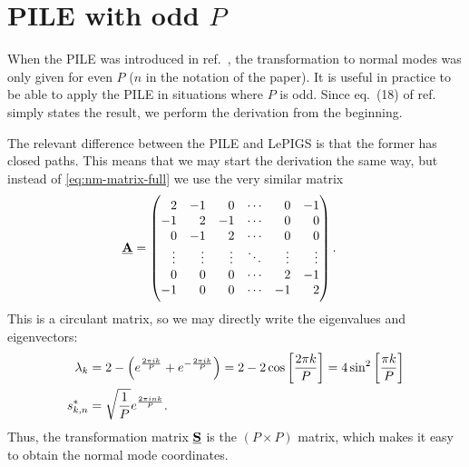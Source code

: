 \section{PILE with odd $P$}

\label{sec:pile-odd}

When the PILE was introduced in ref.~\cite{ceriotti2010efficient}, the transformation to normal modes was only given for even $P$ ($n$ in the notation of the paper).
It is useful in practice to be able to apply the PILE in situations where $P$ is odd.
Since eq.~(18) of ref.~\cite{ceriotti2010efficient} simply states the result, we perform the derivation from the beginning.

The relevant difference between the PILE and LePIGS is that the former has closed paths.
This means that we may start the derivation the same way, but instead of \vref{eq:nm-matrix-full} we use the very similar matrix
\begin{align}
	\underline{\bm{\mathbf{A}}}
	&= \begin{pmatrix}
			\phantom{-}2 & -1 & \phantom{-}0 & \cdots & \phantom{-}0 & -1 \\
			-1 & \phantom{-}2 & -1 & \cdots & \phantom{-}0 & \phantom{-}0 \\
			\phantom{-}0 & -1 & \phantom{-}2 & \cdots & \phantom{-}0 & \phantom{-}0 \\
			\phantom{-}\vdots & \phantom{-}\vdots & \phantom{-}\vdots & \ddots & \phantom{-}\vdots & \phantom{-}\vdots \\
			\phantom{-}0 & \phantom{-}0 & \phantom{-}0 & \cdots & \phantom{-}2 & -1 \\
			-1 & \phantom{-}0 & \phantom{-}0 & \cdots & -1 & \phantom{-}2 \\
		\end{pmatrix}.
\end{align}
This is a circulant matrix, so we may directly write the eigenvalues and eigenvectors:~\cite{karner2003spectral}
\begin{subequations}
\begin{align}
	\lambda_k
	&= 2 - \left( e^{\frac{2 \pi i k}{P}} + e^{-\frac{2 \pi i k}{P}} \right)
	= 2 - 2 \cos{\left[ \frac{2 \pi k}{P} \right]}
	= 4 \sin^2{\left[ \frac{\pi k}{P} \right]} \\
	s_{k,n}^*
	&= \sqrt{\frac{1}{P}} e^{\frac{2 \pi i n k}{P}}.
\end{align}
\end{subequations}
Thus, the transformation matrix $\underline{\bm{\mathbf{S}}}$ is the $(P \times P)$  matrix, which makes it easy to obtain the normal mode coordinates.

